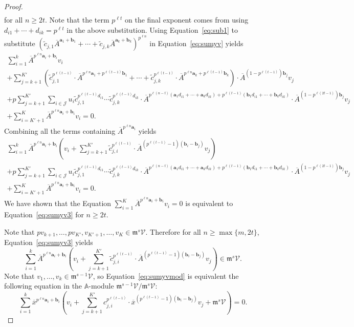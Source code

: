 \documentclass[letterpaper, 11pt, thm-restate]{article}
\numberwithin{equation}{section}
\newcommand{\A}{\mathbb{A}}
\newcommand{\mV}{\mathcal{V}}
\newcommand{\mJ}{\mathcal{J}}
\newcommand{\ba}{\boldsymbol{a}}
\newcommand{\bb}{\boldsymbol{b}}
\newcommand{\tc}{\widetilde{c}}
\newcommand{\ox}{\overline{x}}
\newcommand{\oA}{\overline{A}}
\newcommand{\frm}{\mathfrak{m}}
\theoremstyle{definition}
\theoremstyle{definition}
\theoremstyle{definition}
\begin{document}
\begin{proof}
\begin{multline}
    \end{multline}
    for all $n \geq 2t$.
    Note that the term $p^{\ell t}$ on the final exponent comes from using $d_{i1} + \cdots + d_{ik} = p^{\ell t}$ in the above substitution.
    Using Equation~\eqref{eq:sub1} to substitute $\left(\tc_{j,1} \oA^{\ba_1 + \bb_1} + \cdots + \tc_{j,k} \oA^{\ba_k + \bb_k}\right)^{p^{\ell n}}$ in Equation~\eqref{eq:sumyv} yields
    \begin{multline}\label{eq:sumyv2}
        \sum_{i = 1}^k \oA^{p^{\ell n} \ba_i + \bb_i} v_i \\
        + \sum_{j = k+1}^{K'} \left(\tc_{j,1}^{p^{\ell (t-1)}} \cdot \oA^{p^{\ell n}\ba_1 + p^{\ell (t-1)} \bb_1} + \cdots + \tc_{j,k}^{p^{\ell (t-1)}} \cdot \oA^{p^{\ell n}\ba_k + p^{\ell (t-1)} \bb_k} \right) \cdot \oA^{(1 - p^{\ell (t-1)}) \bb_j} v_j \\
        + p \sum_{j = k+1}^{K'} \sum_{i \in \mJ} u_{i} \tc_{j,1}^{p^{\ell (t-1)}d_{i1}} \cdots \tc_{j,k}^{p^{\ell (t-1)} d_{ik}} \cdot \oA^{p^{\ell (n-t)}(\ba_1 d_{i1} + \cdots + \ba_k d_{ik}) + p^{\ell (t-1)} (\bb_1 d_{i1} + \cdots + \bb_k d_{ik})} \cdot \oA^{(1 - p^{\ell (2t-1)}) \bb_j} v_j \\
        + \sum_{i = K'+1}^K \oA^{p^{\ell n} \ba_i + \bb_i} v_i = 0.
    \end{multline}
    Combining all the terms containing $\oA^{p^{\ell n} \ba_i}$ yields
    \begin{multline}\label{eq:sumyv3}
        \sum_{i = 1}^k \oA^{p^{\ell n} \ba_i + \bb_i} \left(v_i + \sum_{j = k+1}^{K'} \tc_{j,i}^{p^{\ell (t-1)}} \cdot \oA^{(p^{\ell (t-1)} - 1) (\bb_i - \bb_j)} v_j \right) \\
        + p \sum_{j = k+1}^{K'} \sum_{i \in \mJ} u_{i} \tc_{j,1}^{p^{\ell (t-1)}d_{i1}} \cdots \tc_{j,k}^{p^{\ell (t-1)} d_{ik}} \cdot \oA^{p^{\ell (n-t)}(\ba_1 d_{i1} + \cdots + \ba_k d_{ik}) + p^{\ell (t-1)} (\bb_1 d_{i1} + \cdots + \bb_k d_{ik})} \cdot \oA^{(1 - p^{\ell (2t-1)}) \bb_j} v_j \\
        + \sum_{i = K'+1}^K \oA^{p^{\ell n} \ba_i + \bb_i} v_i = 0.
    \end{multline}
    We have shown that the Equation $\sum_{i = 1}^K \oA^{p^{\ell n} \ba_i + \bb_i} v_i = 0$ is equivalent to Equation~\eqref{eq:sumyv3} for $n \geq 2t$.
    
    Note that $p v_{k+1}, \ldots, p v_{K'}, v_{K'+1}, \ldots, v_K \in \frm^s \mV$.
    Therefore for all $n \geq \max\{m, 2t\}$, Equation~\eqref{eq:sumyv3} yields
    \begin{equation}\label{eq:sumyvmod}
    \sum_{i = 1}^k \oA^{p^{\ell n} \ba_i + \bb_i} \left(v_i + \sum_{j = k+1}^{K'} \tc_{j,i}^{p^{\ell (t-1)}} \cdot \oA^{(p^{\ell (t-1)} - 1) (\bb_i - \bb_j)} v_j \right) \in \frm^s \mV.
    \end{equation}
    Note that $v_1, \ldots, v_k \in \frm^{s-1} \mV$, so Equation~\eqref{eq:sumyvmod} is equivalent the following equation in the $\A$-module $\frm^{s-1} \mV/\frm^s\mV$:
    \[
    \sum_{i = 1}^k \ox^{p^{\ell n} \ba_i + \bb_i} \left(v_i + \sum_{j = k+1}^{K'} c_{j,i}^{p^{\ell (t-1)}} \cdot \ox^{(p^{\ell (t-1)} - 1) (\bb_i - \bb_j)} v_j + \frm^s\mV \right) = 0.
    \]


\end{proof}
\end{document}
